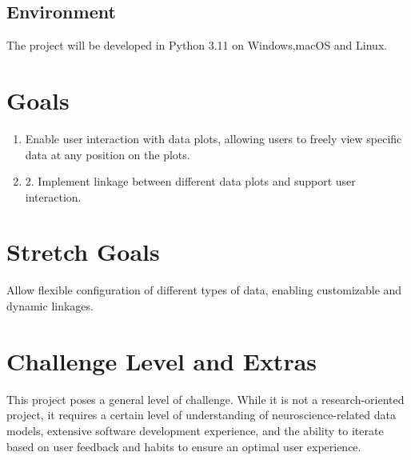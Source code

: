 \documentclass{article}
\begin{document}
\subsection{Environment}
The project will be developed in Python 3.11 on Windows,macOS and Linux.


\section{Goals}
\begin{enumerate}
    \item Enable user interaction with data plots, allowing users to freely view specific data at any position on the plots.
    \item 2. Implement linkage between different data plots and support user interaction.
\end{enumerate}
\section{Stretch Goals}
Allow flexible configuration of different types of data, enabling customizable and dynamic linkages.
\section{Challenge Level and Extras}

This project poses a general level of challenge. While it is not a research-oriented project, it requires a certain level of understanding of neuroscience-related data models, extensive software development experience, and the ability to iterate based on user feedback and habits to ensure an optimal user experience.
\end{document}
